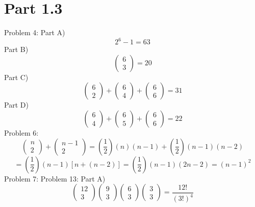 \documentclass{article}
\begin{document}
\section{Part 1.3}
	Problem 4: Part A)
	$$
	2^6-1=63
	$$
	Part B)
	$$
	\left(\begin{array}{c}
	6\\
	3
	\end{array}\right)
	=
	20
	$$
	Part C)
	$$
	\left(\begin{array}{c}
	6\\
	2
	\end{array}\right)
	+
	\left(\begin{array}{c}
	6\\
	4
	\end{array}\right)
	+
	\left(\begin{array}{c}
	6\\
	6
	\end{array}\right)
	=31
	$$
	Part D)
	$$
	\left(\begin{array}{c}
	6\\
	4
	\end{array}\right)
	+
	\left(\begin{array}{c}
	6\\
	5
	\end{array}\right)
	+
	\left(\begin{array}{c}
	6\\
	6
	\end{array}\right)
	=22
	$$
	Problem 6:
	$$
	\left(\begin{array}{c}
	n\\
	2
	\end{array}\right)
	+
	\left(\begin{array}{c}
	n-1\\
	2
	\end{array}\right)
	=
	\left(
	\frac{1}{2}
	\right)
	(n)(n-1)
	+
	\left(
	\frac{1}{2}
	\right)
	(n-1)(n-2)
	$$
	$$
	=
	\left(
	\frac{1}{2}
	\right)
	(n-1)[n+(n-2)]
	=
	\left(
	\frac{1}{2}
	\right)
	(n-1)(2n-2)=(n-1)^2
	$$
	Problem 7:
	Problem 13: Part A)
	$$
	\left(\begin{array}{c}
	12\\
	3
	\end{array}\right)
	\left(\begin{array}{c}
	9\\
	3
	\end{array}\right)
	\left(\begin{array}{c}
	6\\
	3
	\end{array}\right)
	\left(\begin{array}{c}
	3\\
	3
	\end{array}\right)
	=
	\frac{12!}{(3!)^4}
	$$
\end{document}
